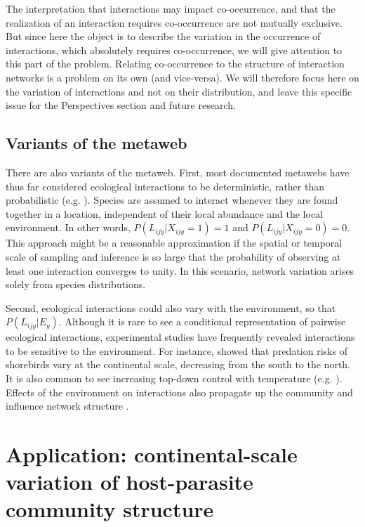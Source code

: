 \documentclass[12pt]{article}
\begin{document}
The interpretation that interactions may impact co-occurrence, and that the
realization of an interaction requires co-occurrence are not mutually
exclusive. But since here the object is to describe the variation in the
occurrence of interactions, which absolutely requires co-occurrence, we will
give attention to this part of the problem. Relating co-occurrence to the
structure of interaction networks is a problem on its own (and vice-versa). We
will therefore focus here on the variation of interactions and not on their
distribution, and leave this specific issue for the Perspectives section and
future research.

\subsection*{Variants of the metaweb}

There are also variants of the metaweb. First, most documented metawebs have
thus far considered ecological interactions to be deterministic, rather than
probabilistic (e.g. \citealt{Havens1992, Wood2015}). Species are assumed to
interact whenever they are found together in a location, independent of their
local abundance and the local environment. In other words,
$P(L_{ijy}|X_{ijy}=1) = 1$ and $P(L_{ijy}|X_{ijy}=0) = 0$. This approach might
be a reasonable approximation if the spatial or temporal scale of sampling and
inference is so large that the probability of observing at least one
interaction converges to unity. In this scenario, network variation arises
solely from species distributions.

Second, ecological interactions could also vary with the environment, so that
$P(L_{ijy}|E_y)$. Although it is rare to see a conditional representation of
pairwise ecological interactions, experimental studies have frequently
revealed interactions to be sensitive to the environment. For instance,
\citet{Mckinnon2010} showed that predation risks of shorebirds vary at the
continental scale, decreasing from the south to the north. It is also common
to see increasing top-down control with temperature (e.g. \citealt{Shurin2012,
Gray2016}). Effects of the environment on interactions \citep{Gibert2014} also
propagate up the community and influence network structure
\citep{Tylianakis2007, Woodward2010, Petchey2010a}.


\section*{Application: continental-scale variation of host-parasite community structure}
\end{document}
